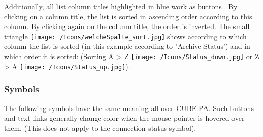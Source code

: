 Additionally, all list column titles highlighted in blue work as buttons . By clicking on a column title, the list is sorted in ascending order according to this column. By clicking again on the column title, the order is inverted. 
The small triangle \texttt{[image: /Icons/welcheSpalte\_sort.jpg]}  shows according to which column the list is sorted (in this example according to 'Archive Status') and in which order it is sorted: (Sorting A {\textgreater} Z \texttt{[image: /Icons/Status\_down.jpg]} or Z {\textgreater} A \texttt{[image: /Icons/Status\_up.jpg]}).

\pagebreak
\subsubsection{Symbols}
\label{bkm:Ref443039356}
The following symbols have the same meaning all over CUBE PA. Such buttons and text links generally change color when the mouse pointer is hovered over them. (This does not apply to the connection status symbol). 

